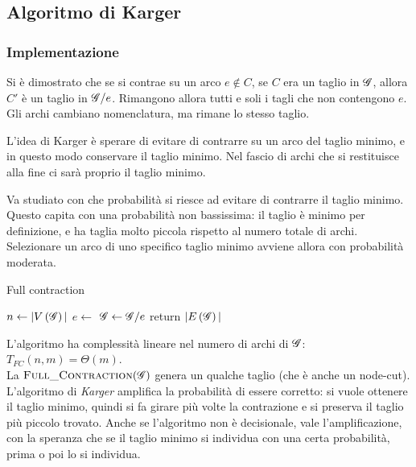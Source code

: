 \subsection{Algoritmo di Karger}

\subsubsection{Implementazione}

Si è dimostrato che se si contrae su un arco $e \notin C$, se $C$ era un taglio in $
\mathscr{G}{}
$, allora $C'$ è un taglio in $
\mathscr{G}{} / e
$.
Rimangono allora tutti e soli i tagli che non contengono $e$.
Gli archi cambiano nomenclatura, ma rimane lo stesso taglio.

L'idea di Karger è sperare di evitare di contrarre su un arco del taglio
minimo, e in questo modo conservare il taglio minimo.
Nel fascio di archi che si restituisce alla fine ci sarà proprio il taglio minimo.

Va studiato con che probabilità si riesce ad evitare di contrarre il taglio minimo.
Questo capita con una probabilità non bassissima:
il taglio è minimo per definizione, e ha taglia molto piccola rispetto al numero totale di archi.
Selezionare un arco di uno specifico taglio minimo avviene allora con probabilità moderata.

\begin{algorithm}[H]
\caption{Full contraction}\label{alg:full_contraction}
\begin{algorithmic}[1]
        \State $n \gets |V \left( \mathscr{G}{} \right)|$
            \State $e \gets $
            \State $\mathscr{G}{} \gets \mathscr{G}{} / e $
        \EndFor
        \State return $|E\left( \mathscr{G}{} \right)|$
    \EndProcedure
\end{algorithmic}
\end{algorithm}
\noindent
L'algoritmo ha complessità lineare nel numero di archi di $
\mathscr{G}{}
$: $
T_{FC} \left( n, m \right)
=
\Theta \left( m \right)
$.
\\
La $
\Call{Full\_Contraction}{\bgg{}}
$ genera un qualche taglio (che è anche un node-cut).
L'algoritmo di \emph{Karger} amplifica la probabilità di essere corretto:
si vuole ottenere il taglio minimo, quindi si fa girare più volte la contrazione e si preserva il taglio più piccolo trovato. 
Anche se l'algoritmo non è decisionale, vale l'amplificazione, con la speranza che se il taglio minimo si individua con una certa probabilità, prima o poi lo si individua.

